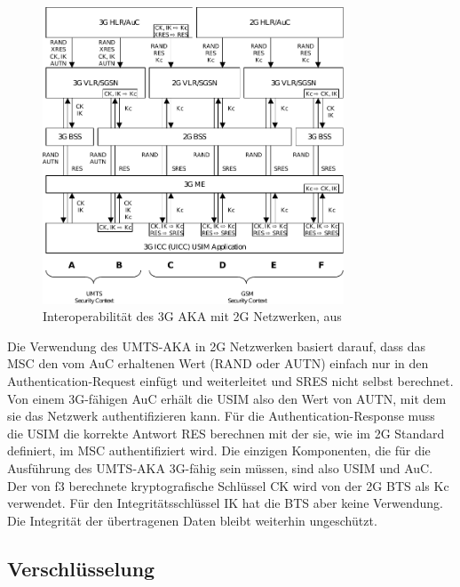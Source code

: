 \begin{figure}[H]
  \begin{center}
    \includegraphics[width=0.8\textwidth]{figures/31900_fig_1}
  \end{center}
  \caption[Interoperabilität des 3G AKA mit 2G Netzwerken]{Interoperabilität des 3G \ac{AKA} mit 2G Netzwerken, aus } \label{fig:3g-aka-in-2g}
\end{figure}

Die Verwendung des \ac{UMTS}-AKA in 2G Netzwerken basiert darauf, dass das \ac{MSC} den vom \ac{AuC} erhaltenen Wert (\ac{RAND} oder \ac{AUTN}) einfach nur in den Authentication-Request einfügt und weiterleitet und \ac{SRES} nicht selbst berechnet. Von einem 3G-fähigen \ac{AuC} erhält die \ac{USIM} also den Wert von \ac{AUTN}, mit dem sie das Netzwerk authentifizieren kann. Für die Authentication-Response muss die \ac{USIM} die korrekte Antwort \ac{RES} berechnen mit der sie, wie im 2G Standard definiert, im \ac{MSC} authentifiziert wird. Die einzigen Komponenten, die für die Ausführung des \ac{UMTS}-\ac{AKA} 3G-fähig sein müssen, sind also \ac{USIM} und \ac{AuC}. Der von f3 berechnete kryptografische Schlüssel \ac{CK} wird von der 2G \ac{BTS} als \ac{Kc} verwendet. Für den Integritätsschlüssel \ac{IK} hat die \ac{BTS} aber keine Verwendung. Die Integrität der übertragenen Daten bleibt weiterhin ungeschützt.

\subsection{Verschlüsselung} \label{hdl:ciphering}

